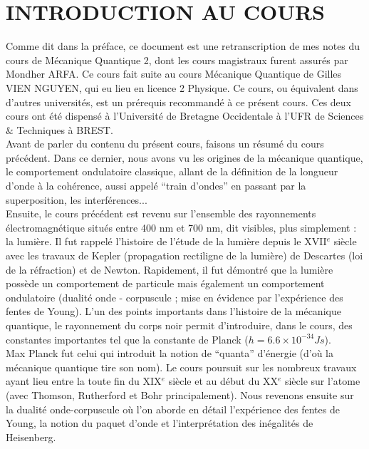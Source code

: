 \documentclass[12pt,a4paper,titlepage]{book}
\begin{document}
\newpage
\chapter*{INTRODUCTION AU COURS}

Comme dit dans la préface, ce document est une retranscription de mes notes du cours de Mécanique Quantique 2, dont les cours magistraux furent assurés par Mondher ARFA. Ce cours fait suite au cours Mécanique Quantique de Gilles VIEN NGUYEN, qui eu lieu en licence 2 Physique. Ce cours, ou équivalent dans d'autres universités, est un prérequis recommandé à ce présent cours. Ces deux cours ont été dispensé à l'Université de Bretagne Occidentale à l'UFR de Sciences $\&$ Techniques à BREST.\\

Avant de parler du contenu du présent cours, faisons un résumé du cours précédent. Dans ce dernier, nous avons vu les origines de la mécanique quantique, le comportement ondulatoire classique, allant de la définition de la longueur d'onde à la cohérence, aussi appelé \enquote{train d'ondes} en passant par la superposition, les interférences...\\

Ensuite, le cours précédent est revenu sur l'ensemble des rayonnements électromagnétique situés entre 400 nm et 700 nm, dit visibles, plus simplement : la lumière. Il fut rappelé l'histoire de l'étude de la lumière depuis le XVII$^e$ siècle avec les travaux de Kepler (propagation rectiligne de la lumière) de Descartes (loi de la réfraction) et de Newton. Rapidement, il fut démontré que la lumière possède un comportement de particule mais également un comportement ondulatoire (dualité onde - corpuscule ; mise en évidence par l'expérience des fentes de Young). L'un des points importants dans l'histoire de la mécanique quantique, le rayonnement du corps noir permit d'introduire, dans le cours, des constantes importantes tel que la constante de Planck ($h = 6.6 \times 10^{-34} Js$).\\

Max Planck fut celui qui introduit la notion de \enquote{quanta} d'énergie (d'où la mécanique quantique tire son nom). Le cours poursuit sur les nombreux travaux ayant lieu entre la toute fin du XIX$^e$ siècle et au début du XX$^e$ siècle sur l'atome (avec Thomson, Rutherford et Bohr principalement). Nous revenons ensuite sur la dualité onde-corpuscule où l'on aborde en détail l'expérience des fentes de Young, la notion du paquet d'onde et l'interprétation des inégalités de Heisenberg.\\
\end{document}
